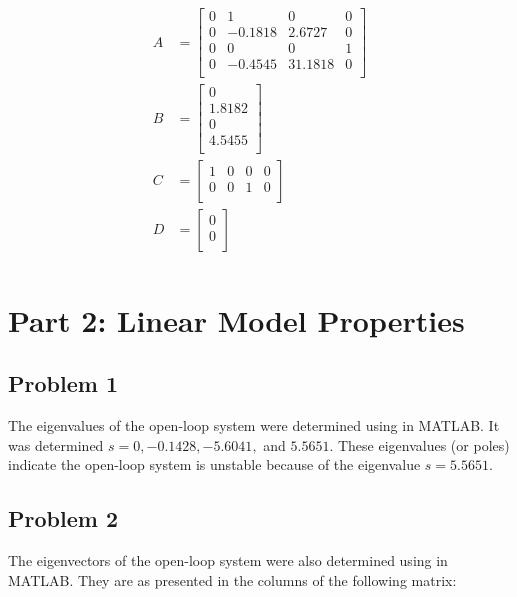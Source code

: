 \documentclass[12pt, letterpaper, onecolumn]{article}
\begin{document}
\begin{equation*}
    \begin{split}
        A & =
        \begin{bmatrix}
            0 & 1       & 0       & 0 \\
            0 & -0.1818 & 2.6727  & 0 \\
            0 & 0       & 0       & 1 \\
            0 & -0.4545 & 31.1818 & 0 \\
        \end{bmatrix} \\
        B & =
        \begin{bmatrix}
            0      \\
            1.8182 \\
            0      \\
            4.5455 \\
        \end{bmatrix} \\
        C & =
        \begin{bmatrix}
            1 & 0 & 0 & 0 \\
            0 & 0 & 1 & 0 \\
        \end{bmatrix} \\
        D & =
        \begin{bmatrix}
            0 \\
            0 \\
        \end{bmatrix} \\
    \end{split}
\end{equation*}


\clearpage

\section*{Part 2: Linear Model Properties}

\subsection*{Problem 1}
The eigenvalues of the open-loop system were determined using  in MATLAB\@. It was determined $s=0, -0.1428,-5.6041,$ and $5.5651$. These eigenvalues (or poles) indicate the open-loop system is unstable because of the eigenvalue $s=5.5651$.
\subsection*{Problem 2}
The eigenvectors of the open-loop system were also determined using  in MATLAB\@. They are as presented in the columns of the following matrix:
\end{document}
